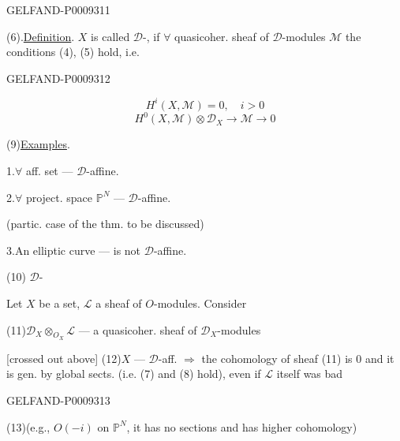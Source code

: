 \begin{GelfandAdjacentEvidence}{GELFAND-P000931}{1}

(6).\quad \underline{Definition}. $X$ is called $\mathcal D$-, if $\forall$ quasicoher. sheaf of $\mathcal D$-modules $\mathcal M$ the conditions (4), (5) hold, i.e.
\end{GelfandAdjacentEvidence}
\begin{GelfandAdjacentEvidence}{GELFAND-P000931}{2}

\begin{equation*}
 H^i(X,\mathcal M)=0,\quad i>0
 \tag{7}
\end{equation*}
\begin{equation*}
 H^0(X,\mathcal M)\otimes\mathcal D_X\longrightarrow\mathcal M\longrightarrow0
 \tag{8}
\end{equation*}

(9)\quad \underline{Examples}.

1.\enspace $\forall$ aff. set --- $\mathcal D$-affine.

2.\enspace $\forall$ project. space $\mathbb P^N$ --- $\mathcal D$-affine.

(partic. case of the thm. to be discussed)

3.\enspace An elliptic curve --- is not $\mathcal D$-affine.

(10)\quad {} $\mathcal D$-

Let $X$ be a set, $\mathcal L$ a sheaf of $O$-modules. Consider

(11)\quad $\mathcal D_X\otimes_{O_X}\mathcal L$ --- a quasicoher. sheaf of $\mathcal D_X$-modules

[crossed out above]
(12)\quad $X$ --- $\mathcal D$-aff. \(\Rightarrow\) the cohomology of sheaf (11) is $0$ and it is gen. by global sects. (i.e. (7) and (8) hold), even if $\mathcal L$ itself was bad
\end{GelfandAdjacentEvidence}
\begin{GelfandAdjacentEvidence}{GELFAND-P000931}{3}


(13)\quad (e.g., $O(-i)$ on $\mathbb P^N$, it has no sections and has higher cohomology)
\end{GelfandAdjacentEvidence}

